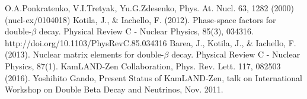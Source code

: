 \documentclass[11pt,prd,letterpaper,amsmath,amssymb,final,nofootinbib
,unsortedaddress,superscriptaddress
]{revtex4-1}
\begin{document}
\begin{thebibliography}{00}
 O.A.Ponkratenko, V.I.Tretyak, Yu.G.Zdesenko, Phys. At. Nucl. 63, 1282   (2000)  (nucl-ex/0104018)
 Kotila, J., \& Iachello, F. (2012). Phase-space factors for double-$\beta$ decay. Physical Review C - Nuclear Physics, 85(3), 034316. http://doi.org/10.1103/PhysRevC.85.034316
 Barea, J., Kotila, J., \& Iachello, F. (2013). Nuclear matrix elements for double-$\beta$ decay. Physical Review C - Nuclear Physics, 87(1).
 KamLAND-Zen Collaboration, Phys. Rev. Lett. 117, 082503 (2016).
 Yoshihito Gando, Present Status of KamLAND-Zen, talk on International Workshop on Double Beta Decay and Neutrinos, Nov. 2011.
\end{thebibliography}




\end{document}
